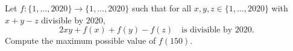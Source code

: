 Let $f\colon\{1,\dots,2020\}\to\{1,\dots,2020\}$ such that for all $x,y,z\in\{1,\dots,2020\}$ with $x+y-z$ divisible by $2020$,
	\[
		2xy+f(x)+f(y)-f(z)\quad\text{is divisible by $2020$}.
	\]
	Compute the maximum possible value of $f(150)$.
	
